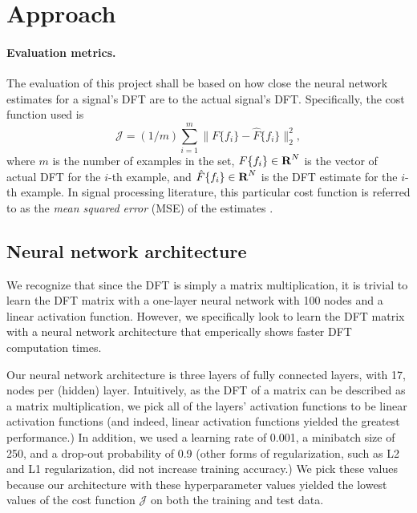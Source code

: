 \documentclass[12pt]{article}
\begin{document}
\section{Approach} \label{s-approach}

\paragraph{Evaluation metrics.}
The evaluation of this project shall be based on how close the neural network estimates for 
a signal's DFT are to the actual signal's DFT. Specifically, the cost function used is
\[
\mathcal J = (1/m) \sum_{i = 1}^{m} \|F\{f_i\} - \hat{F}\{f_i\} \|_2^2,
\]
where $m$ is the number of examples in the set, $F\{f_i\} \in {\mbox{\bf R}}^N$ is the vector of actual DFT 
for the $i$-th example, and $\hat{F}\{f_i\} \in {\mbox{\bf R}}^N$ is the DFT estimate for the $i$-th example. 
In signal processing literature, this particular cost function is referred to as the 
\emph{mean squared error} (MSE) of the estimates \cite{DG:10}.

\subsection{Neural network architecture} 
We recognize that since the DFT is simply a matrix multiplication, it is trivial to learn the DFT matrix with
a one-layer neural network with 100 nodes and a linear activation function. However, we specifically look to 
learn the DFT matrix with a neural network architecture that emperically shows faster DFT computation times.

Our neural network architecture is three layers of fully connected layers, with 17, nodes per (hidden) layer. 
Intuitively, as the DFT of a matrix can be described as a matrix multiplication, we pick all of the layers' 
activation functions to be linear activation functions (and indeed, linear activation functions yielded the 
greatest performance.) In addition, we used a learning rate of 0.001, a minibatch size of 250, and a drop-out 
probability of 0.9 (other forms of regularization, such as L2 and L1 regularization, did not increase training
accuracy.) We pick these values because our architecture with these hyperparameter values yielded the 
lowest values of the cost function $\mathcal J$ on both the training and test data.
\end{document}
